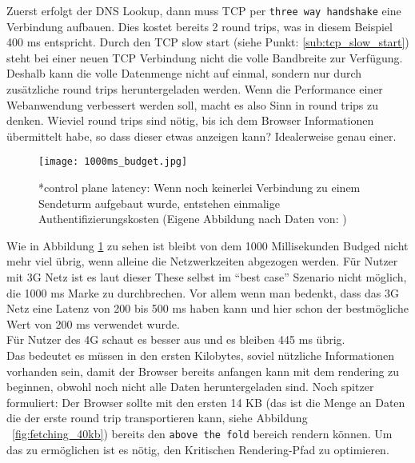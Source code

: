 		Zuerst erfolgt der DNS Lookup, dann muss TCP per \texttt{three way handshake} eine Verbindung aufbauen. Dies kostet bereits 2 round trips, was in diesem Beispiel 400 ms entspricht.
		Durch den TCP slow start (siehe Punkt: \ref{sub:tcp_slow_start}) steht bei einer neuen TCP Verbindung nicht die volle Bandbreite zur Verfügung. Deshalb kann die volle Datenmenge nicht auf einmal, sondern nur durch zusätzliche round trips heruntergeladen werden. Wenn die Performance einer Webanwendung verbessert werden soll, macht es also Sinn in round trips zu denken. Wieviel round trips sind nötig, bis ich dem Browser Informationen übermittelt habe, so dass dieser etwas anzeigen kann? Idealerweise genau einer. 
		
		\begin{figure}[htbp]
			\begin{center}
				\texttt{[image: 1000ms\_budget.jpg]}
				\caption{*control plane latency: Wenn noch keinerlei Verbindung zu einem Sendeturm aufgebaut wurde, entstehen einmalige Authentifizierungskosten (Eigene Abbildung nach Daten von: \autocite{venturebeat}\autocite[p. 7, 12]{grigorikRadio})}
				\label{fig:1000ms_budget}
			\end{center}
		\end{figure}

		Wie in Abbildung \ref{fig:1000ms_budget} zu sehen ist bleibt von dem 1000 Millisekunden Budged nicht mehr viel übrig, wenn alleine die Netzwerkzeiten abgezogen werden. Für Nutzer mit 3G Netz ist es laut dieser These selbst im "`best case"' Szenario nicht möglich, die 1000 ms Marke zu durchbrechen. Vor allem wenn man bedenkt, dass das 3G Netz eine Latenz von 200 bis 500 ms haben kann und hier schon der bestmögliche Wert von 200 ms verwendet wurde.\\
		Für Nutzer des 4G schaut es besser aus und es bleiben 445 ms übrig.\\
		Das bedeutet es müssen in den ersten Kilobytes, soviel nützliche Informationen vorhanden sein, damit der Browser bereits anfangen kann mit dem rendering zu beginnen, obwohl noch nicht alle Daten heruntergeladen sind. Noch spitzer formuliert: Der Browser sollte mit den ersten 14 KB (das ist die Menge an Daten die der erste round trip transportieren kann, siehe Abbildung ~\ref{fig:fetching_40kb}) bereits den \texttt{above the fold} bereich rendern können. Um das zu ermöglichen ist es nötig, den Kritischen Rendering-Pfad zu optimieren.
		

